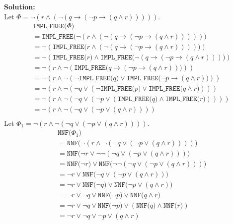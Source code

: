\documentclass{article}
\begin{document}
\noindent\textbf{Solution:}
\\[2em]
Let $\Phi = \neg\left(r \land \left(\neg \left(q \to \left(\neg p \to \left(q \land r\right)\right)\right)\right)\right)$.
\newcommand{\cnf}[1]{\texttt{CNF($#1$)}}
\newcommand{\nnf}[1]{\texttt{NNF($#1$)}}
\newcommand{\impf}[1]{\texttt{IMPL\_FREE($#1$)}}
\newcommand{\distr}[2]{\texttt{DISTR($#1,#2$)}}
\begin{align*}
& \impf{\Phi}\\
&= \impf{\neg\left(r \land \left(\neg \left(q \to \left(\neg p \to \left(q \land r\right)\right)\right)\right)\right)}\\
&= \neg(\impf{r \land \left(\neg \left(q \to \left(\neg p \to \left(q \land r\right)\right)\right)\right)})\\
&= \neg(\impf{r} \land \impf{\neg \left(q \to \left(\neg p \to \left(q \land r\right)\right)\right)})\\
&= \neg(r \land \neg(\impf{q \to \left(\neg p \to \left(q \land r\right)\right)}))\\
&= \neg(r \land \neg(\neg \impf{q} \lor \impf{\neg p \to \left(q \land r\right)}))\\
&= \neg(r \land \neg(\neg q \lor (\neg \impf{p} \lor \impf{q \land r})))\\
&= \neg(r \land \neg(\neg q \lor (\neg p \lor (\impf{q} \land \impf{r}))))\\
&= \neg(r \land \neg(\neg q \lor (\neg p \lor (q \land r))))\\
\end{align*}
Let $\Phi_1 = \neg(r \land \neg(\neg q \lor (\neg p \lor (q \land r))))$.
\begin{align*}
& \nnf{\Phi_1} \\
&= \nnf{\neg(r \land \neg(\neg q \lor (\neg p \lor (q \land r))))} \\
&= \nnf{\neg r \lor \neg\neg(\neg q \lor (\neg p \lor (q \land r)))} \\
&= \nnf{\neg r} \lor \nnf{\neg\neg(\neg q \lor (\neg p \lor (q \land r)))} \\
&= \neg r \lor \nnf{\neg q \lor (\neg p \lor (q \land r))} \\
&= \neg r \lor \nnf{\neg q} \lor \nnf{\neg p \lor (q \land r)} \\
&= \neg r \lor \neg q \lor \nnf{\neg p} \lor \nnf{q \land r} \\
&= \neg r \lor \neg q \lor \nnf{\neg p} \lor (\nnf{q} \land \nnf{r}) \\
&= \neg r \lor \neg q \lor \neg p \lor (q \land r) \\
\end{align*}
\end{document}
